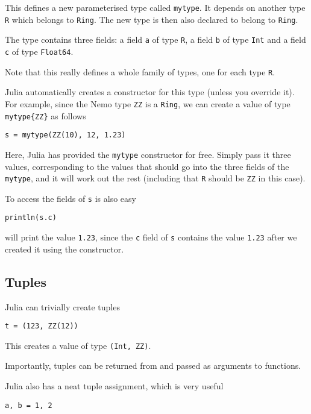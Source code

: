 \documentclass[a4paper,10pt]{article}
\newcommand{\code}{\lstinline}
\begin{document}
{This defines a new parameterised type called \code{mytype}. It depends on another type
\code{R} which belongs to \code{Ring}. The new type is then also declared to belong to
\code{Ring}.

The type contains three fields: a field \code{a} of type \code{R}, a field \code{b} of
type \code{Int} and a field \code{c} of type \code{Float64}.

Note that this really defines a whole family of types, one for each type \code{R}.

Julia automatically creates a constructor for this type (unless you override it). For
example, since the Nemo type \code{ZZ} is a \code{Ring}, we can create a value of
type \code|mytype{ZZ}| as follows

\begin{lstlisting}
s = mytype(ZZ(10), 12, 1.23)
\end{lstlisting}

Here, Julia has provided the \code{mytype} constructor for free. Simply pass it three
values, corresponding to the values that should go into the three fields of the 
\code{mytype}, and it will work out the rest (including that \code{R} should be
\code{ZZ} in this case).

To access the fields of \code{s} is also easy

\begin{lstlisting}
println(s.c)
\end{lstlisting}

will print the value \code{1.23}, since the \code{c} field of \code{s} contains the
value \code{1.23} after we created it using the constructor.

\subsection{Tuples}

Julia can trivially create tuples

\begin{lstlisting}
t = (123, ZZ(12))
\end{lstlisting}

This creates a value of type \code{(Int, ZZ)}.

Importantly, tuples can be returned from and passed as arguments to functions.

Julia also has a neat tuple assignment, which is very useful

\begin{lstlisting}
a, b = 1, 2
\end{lstlisting}

}
\end{document}
